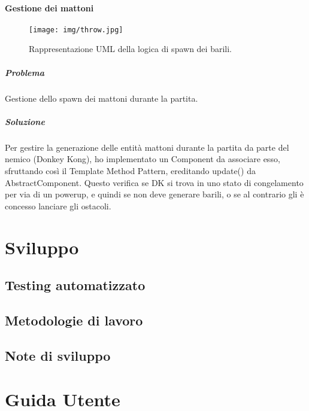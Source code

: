 \subsubsection{Gestione dei mattoni}

\begin{figure}[H]
\centering{}
\texttt{[image: img/throw.jpg]}
\caption{Rappresentazione UML della logica di spawn dei barili.}
\end{figure}

\paragraph{Problema} Gestione dello spawn dei mattoni durante la partita.

\paragraph{Soluzione} Per gestire la generazione delle entità mattoni durante la partita da parte del nemico (Donkey Kong), ho implementato un Component da associare esso, sfruttando così il Template Method Pattern, ereditando update() da AbstractComponent. Questo verifica se DK si trova in uno stato di congelamento per via di un powerup, e quindi se non deve generare barili, o se al contrario gli è concesso lanciare gli ostacoli.

\chapter{Sviluppo}
\section{Testing automatizzato}
\section{Metodologie di lavoro}
\section{Note di sviluppo}

\chapter{Guida Utente}


